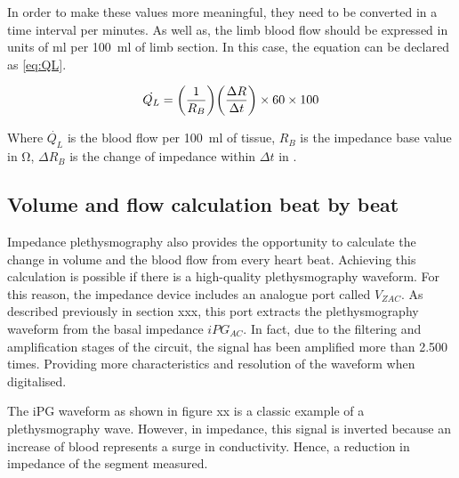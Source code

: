 In order to make these values more meaningful, they need to be converted in a time interval per minutes. As well as, the limb blood flow should be expressed in units of \si{\milli\litre} per \SI{100}{\milli\litre} of limb section. In this case, the equation can be declared as \ref{eq:QL}.

\begin{align}
	\label{eq:QL}
	\dot{Q_L} = \bigg( \frac{1}{R_B} \bigg) \bigg( \frac{\Delta R}{\Delta t} \bigg) \times 60  \times 100  \tagaddtext{[\si{ml/min.100.ml}]}
\end{align} 


Where $\dot{Q_L}$ is the blood flow per \SI{100}{\milli\litre} of tissue, $R_B$ is the impedance base value in \si{\ohm}, $\Delta R_B$ is the change of impedance within ${\Delta t}$ in \si{\sec}.

\subsection{Volume and flow calculation beat by beat}
\label{section procedure 4.2}
Impedance plethysmography also provides the opportunity to calculate the change in volume and the blood flow from every heart beat. Achieving this calculation is possible if there is a high-quality plethysmography waveform. For this reason, the impedance device includes an analogue port called $V_{ZAC}$. As described previously in section xxx, this port extracts the plethysmography waveform from the basal impedance $iPG_{AC}$. In fact, due to the filtering and amplification stages of the circuit, the signal has been amplified more than 2.500 times. Providing more characteristics and resolution of the waveform when digitalised.


The iPG waveform as shown in figure xx is a classic example of a plethysmography wave. However, in impedance, this signal is inverted because an increase of blood represents a surge in conductivity. Hence, a reduction in impedance of the segment measured.  


